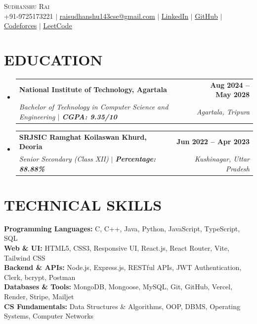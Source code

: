 \documentclass[letterpaper,11pt]{article}
\makeatletter
\newcommand{\resumeSubheading}[4]{
  \vspace{-2pt}\item
    \begin{tabular*}{1.0\textwidth}[t]{l@{\extracolsep{\fill}}r}
      \textbf{\large#1} & \textbf{\small #2} \\
      \textit{\small#3} & \textit{\small #4} \\
    \end{tabular*}\vspace{-7pt}
}
\newcommand{\resumeSubHeadingListStart}{\begin{itemize}[leftmargin=0.0in, label={}]}
\newcommand{\resumeSubHeadingListEnd}{\end{itemize}}
\makeatother
\begin{document}
\begin{center}
    {\Huge \scshape Sudhanshu Rai} \\ \vspace{2pt}
    \small +91-9725173221 $|$
    \href{mailto:raisudhanshu143cse@gmail.com}{\underline{raisudhanshu143cse@gmail.com}} $|$
    \href{https://linkedin.com/in/sudhanshu-rai2005}{\underline{LinkedIn}} $|$
    \href{https://github.com/sudhanshurai2004}{\underline{GitHub}} $|$
    \href{https://codeforces.com/profile/sudhanshurai2005}{\underline{Codeforces}} $|$
    \href{https://leetcode.com/u/sudhanshurai2005}{\underline{LeetCode}}
\end{center}
\vspace{-18pt}

\section{EDUCATION}
\resumeSubHeadingListStart
    \resumeSubheading
      {National Institute of Technology, Agartala}{Aug 2024 -- May 2028}
      {Bachelor of Technology in Computer Science and Engineering $|$ \textbf{CGPA: 9.35/10}}{Agartala, Tripura}
    \resumeSubheading
      {SRJSIC Ramghat Koilaswan Khurd, Deoria}{Jun 2022 -- Apr 2023}
      {Senior Secondary (Class XII) $|$ \textbf{Percentage: 88.88\%}}{Kushinagar, Uttar Pradesh}
\resumeSubHeadingListEnd
\vspace{-14pt}

\section{TECHNICAL SKILLS}
\begin{itemize}[leftmargin=0.15in, label={}]
    \small{\item{
     \textbf{Programming Languages:}{ C, C++, Java, Python, JavaScript, TypeScript, SQL} \\
     \textbf{Web \& UI:}{ HTML5, CSS3, Responsive UI, React.js, React Router, Vite, Tailwind CSS} \\
     \textbf{Backend \& APIs:}{ Node.js, Express.js, RESTful APIs, JWT Authentication, Clerk, bcrypt, Postman} \\
     \textbf{Databases \& Tools:}{ MongoDB, Mongoose, MySQL, Git, GitHub, Vercel, Render, Stripe, Mailjet} \\
     \textbf{CS Fundamentals:}{ Data Structures \& Algorithms, OOP, DBMS, Operating Systems, Computer Networks}
    }}
\end{itemize}
\vspace{-16pt}
\end{document}
